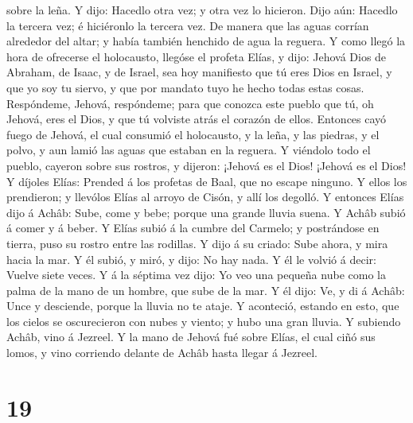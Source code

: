 sobre la leña. Y dijo: Hacedlo otra vez; y otra vez lo hicieron. Dijo
aún: Hacedlo la tercera vez; é hiciéronlo la tercera vez. 
De manera que las aguas corrían alrededor del altar; y había también
henchido de agua la reguera.  Y como llegó la hora de
ofrecerse el holocausto, llegóse el profeta Elías, y dijo: Jehová Dios
de Abraham, de Isaac, y de Israel, sea hoy manifiesto que tú eres Dios
en Israel, y que yo soy tu siervo, y que por mandato tuyo he hecho todas
estas cosas.  Respóndeme, Jehová, respóndeme; para que
conozca este pueblo que tú, oh Jehová, eres el Dios, y que tú volviste
atrás el corazón de ellos.  Entonces cayó fuego de Jehová,
el cual consumió el holocausto, y la leña, y las piedras, y el polvo, y
aun lamió las aguas que estaban en la reguera.  Y viéndolo
todo el pueblo, cayeron sobre sus rostros, y dijeron: ¡Jehová es el
Dios! ¡Jehová es el Dios!  Y díjoles Elías: Prended á los
profetas de Baal, que no escape ninguno. Y ellos los prendieron; y
llevólos Elías al arroyo de Cisón, y allí los degolló.  Y
entonces Elías dijo á Achâb: Sube, come y bebe; porque una grande lluvia
suena.  Y Achâb subió á comer y á beber. Y Elías subió á la
cumbre del Carmelo; y postrándose en tierra, puso su rostro entre las
rodillas.  Y dijo á su criado: Sube ahora, y mira hacia la
mar. Y él subió, y miró, y dijo: No hay nada. Y él le volvió á decir:
Vuelve siete veces.  Y á la séptima vez dijo: Yo veo una
pequeña nube como la palma de la mano de un hombre, que sube de la mar.
Y él dijo: Ve, y di á Achâb: Unce y desciende, porque la lluvia no te
ataje.  Y aconteció, estando en esto, que los cielos se
oscurecieron con nubes y viento; y hubo una gran lluvia. Y subiendo
Achâb, vino á Jezreel.  Y la mano de Jehová fué sobre
Elías, el cual ciñó sus lomos, y vino corriendo delante de Achâb hasta
llegar á Jezreel.

\hypertarget{section-18}{%
\section{19}\label{section-18}}

